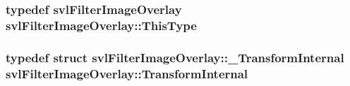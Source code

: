 \hypertarget{classsvl_filter_image_overlay_a9e4175de9ad9d65a5621a9fd78da6227}{
\subsubsection[{This\-Type}]{\setlength{\rightskip}{0pt plus 5cm}typedef {\bf svl\-Filter\-Image\-Overlay} {\bf svl\-Filter\-Image\-Overlay\-::\-This\-Type}}}\label{classsvl_filter_image_overlay_a9e4175de9ad9d65a5621a9fd78da6227}
\hypertarget{classsvl_filter_image_overlay_a18061cddeca5ead367351cc833ce7c4e}{
\subsubsection[{Transform\-Internal}]{\setlength{\rightskip}{0pt plus 5cm}typedef struct {\bf svl\-Filter\-Image\-Overlay\-::\-\_\-\-Transform\-Internal}  {\bf svl\-Filter\-Image\-Overlay\-::\-Transform\-Internal}\hspace{0.3cm}{\ttfamily [protected]}}}\label{classsvl_filter_image_overlay_a18061cddeca5ead367351cc833ce7c4e}


